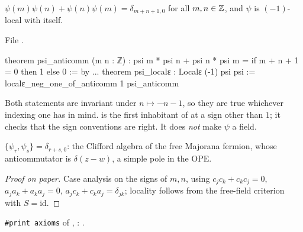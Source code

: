 \begin{theorem}\label{l17:thm:psicar}
$\psi(m)\psi(n)+\psi(n)\psi(m)=\delta_{m+n+1,0}$ for all $m,n\in{\mathbb{Z}}$, and $\psi$ is $(-1)$-local with
itself.
\end{theorem}
\noindent File .
\begin{leancode}
theorem psi_anticomm (m n : ℤ) :
    psi m * psi n + psi n * psi m = if m + n + 1 = 0 then 1 else 0 := by
...
theorem psi_localε : Localε (-1) psi psi :=
  localε_neg_one_of_anticomm 1 psi_anticomm
\end{leancode}
\begin{dictionary}
Both statements are invariant under $n\mapsto-n-1$, so they are true whichever indexing one has in
mind.  is the first inhabitant of  at a sign other than $1$; it checks
that the sign conventions are right. It does \emph{not} make $\psi$ a field.
\end{dictionary}
\begin{physics}
$\{\psi_r,\psi_s\}=\delta_{r+s,0}$: the Clifford algebra of the free Majorana fermion, whose
anticommutator is $\delta(z-w)$, a simple pole in the OPE.
\end{physics}
\begin{proof}[Proof on paper]
Case analysis on the signs of $m,n$, using $c_jc_k+c_kc_j=0$, $a_ja_k+a_ka_j=0$, $a_jc_k+c_ka_j=\delta_{jk}$;
locality follows from the free-field criterion with $S=\mathrm{id}$.
\end{proof}
\begin{status}
\texttt{\#print axioms} of , :
.
\end{status}

